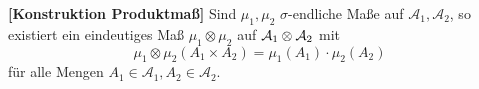
\begin{satz}\label{Produktmass}
 \textbf{[Konstruktion Produktmaß]}
	Sind $\mu_1,\mu_2$ $\sigma$-endliche Ma\ss e auf $\mathcal A_1, \mathcal A_2$, so existiert ein eindeutiges Maß $\mu_1 \otimes \mu_2$ auf $\mathcal{A}_1 \otimes \mathcal{A}_2$ mit $$ \mu_1\otimes \mu_2(A_1\times A_2) = \mu_1(A_1) \cdot \mu_2(A_2)$$
		f\"ur alle Mengen $A_1\in \mathcal A_1, A_2\in \mathcal A_2$.
\end{satz}
